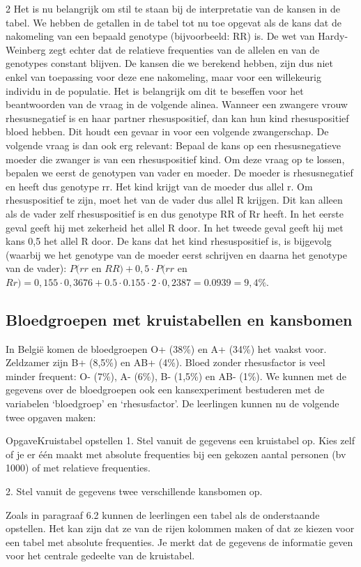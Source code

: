 \begin{multicols}{2}
Het is nu belangrijk om stil te staan bij de interpretatie van de kansen in de tabel. We hebben de getallen in de tabel tot nu toe opgevat als de kans dat de nakomeling van een bepaald genotype (bijvoorbeeld: RR) is. De wet van Hardy-Weinberg zegt echter dat de relatieve frequenties van de allelen en van de genotypes constant blijven. De kansen die we berekend hebben, zijn dus niet enkel van toepassing voor deze ene nakomeling, maar voor een willekeurig individu in de populatie. Het is belangrijk om dit te beseffen voor het beantwoorden van de vraag in de volgende alinea.
Wanneer een zwangere vrouw rhesusnegatief is en haar partner rhesuspositief, dan kan hun kind rhesuspositief bloed hebben. Dit houdt een gevaar in voor een volgende zwangerschap. De volgende vraag is dan ook erg relevant: Bepaal de kans op een rhesusnegatieve moeder die zwanger is van een rhesuspositief kind. Om deze vraag op te lossen, bepalen we eerst de genotypen van vader en moeder. De moeder is rhesusnegatief en heeft dus genotype rr. Het kind krijgt van de moeder dus allel r. Om rhesuspositief te zijn, moet het van de vader dus allel R krijgen. Dit kan alleen als de vader zelf rhesuspositief is en dus genotype RR of Rr heeft. In het eerste geval geeft hij met zekerheid het allel R door. In het tweede geval geeft hij met kans 0,5 het allel R door.  De kans dat het kind rhesuspositief is, is bijgevolg (waarbij we het genotype van de moeder eerst schrijven en daarna het genotype van de vader): $P(rr$ en $RR)+0,5\cdot P(rr$ en $Rr)=0,155\cdot0,3676+0.5\cdot0.155\cdot 2\cdot 0,2387=0.0939=9,4\%$.


\subsection*{Bloedgroepen met kruistabellen en kansbomen}
In België komen de bloedgroepen O+ (38\%) en A+ (34\%) het vaakst voor. Zeldzamer zijn B+ (8,5\%) en AB+ (4\%). Bloed zonder rhesusfactor is veel minder frequent: O- (7\%), A- (6\%), B- (1,5\%) en AB- (1\%). 
We kunnen met de gegevens over de bloedgroepen ook een kansexperiment bestuderen met de variabelen ‘bloedgroep’ en ‘rhesusfactor’. De leerlingen kunnen nu de volgende twee opgaven maken:
\begin{kader}{Opgave}{Kruistabel opstellen}
1. Stel vanuit de gegevens een kruistabel op. Kies zelf of je er één maakt met absolute frequenties bij een gekozen aantal personen (bv 1000) of met relatieve frequenties.

2. Stel vanuit de gegevens twee verschillende kansbomen op. 
\end{kader}
\vspace{0.5 cm}
Zoals in paragraaf 6.2 kunnen de leerlingen een tabel als de onderstaande opstellen. Het kan zijn dat ze van de rijen kolommen maken of dat ze kiezen voor een tabel met absolute frequenties. Je merkt dat de gegevens de informatie geven voor het centrale gedeelte van de kruistabel.
\end{multicols}
